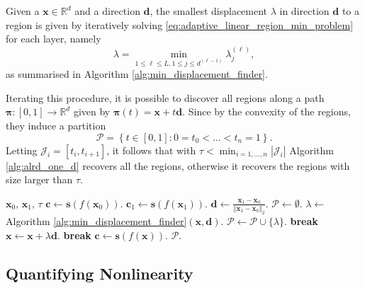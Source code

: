 Given a $\mathbf{x}\in\mathbb{R}^d$ and a direction $\mathbf{d}$, the smallest displacement $\lambda$ in direction $\mathbf{d}$ to a region is given by iteratively solving \eqref{eq:adaptive_linear_region_min_problem} for each layer, namely $$\lambda=\min_{1\leq\ell\leq L,1\leq j\leq d^{(\ell-1)}}\lambda_j^{(\ell)},$$as summarised in Algorithm \ref{alg:min_displacement_finder}.

Iterating this procedure, it is possible to discover all regions along a path $\boldsymbol{\pi}:[0,1]\to\mathbb{R}^d$ given by $\boldsymbol{\pi}(t)=\mathbf{x}+t\mathbf{d}$. Since by the convexity of the regions, they induce a partition 
\begin{equation}\label{eq:path_region_partition}
    \mathcal{P}=\left\{t\in[0,1]:0=t_0<\dots<t_n=1\right\}.
\end{equation}
Letting $\mathcal{J}_i=\left[t_i,t_{i+1}\right]$, it follows that with $\tau<\min_{i=1,\dots,n}\left\vert\mathcal{J}_i\right\vert$ Algorithm \ref{alg:alrd_one_d} recovers all the regions, otherwise it recovers the regions with size larger than $\tau$.

\begin{algorithm}
\caption{Adaptive linear region discovery on compact one-dimensional domains.}\label{alg:alrd_one_d}
\begin{algorithmic}
\Require $\mathbf{x}_0$, $\mathbf{x}_1$, $\tau$
\State $\mathbf{c}\leftarrow\mathbf{s}\left(f\left(\mathbf{x}_0\right)\right)$.
\State $\mathbf{c}_1\leftarrow\mathbf{s}\left(f\left(\mathbf{x}_1\right)\right)$.
\State $\mathbf{d}\leftarrow\frac{\mathbf{x}_1-\mathbf{x}_0}{\left\Vert\mathbf{x}_1-\mathbf{x}_0\right\Vert_2}$.
\State $\mathcal{P}\leftarrow\emptyset$.
\State $\lambda\leftarrow$ Algorithm \ref{alg:min_displacement_finder}$(\mathbf{x},\mathbf{d})$.
\State $\mathcal{P}\leftarrow\mathcal{P}\cup\{\lambda\}$.
\If{$\lambda=\infty$}
\State \textbf{break}
\EndIf
\State $\mathbf{x}\leftarrow\mathbf{x}+\lambda\mathbf{d}$.
\State \textbf{break}
\EndIf
\State $\mathbf{c}\leftarrow\mathbf{s}(f(\mathbf{x}))$.
\EndWhile
\State \Return $\mathcal{P}$.
\end{algorithmic}
\end{algorithm}

\subsection{Quantifying Nonlinearity}

